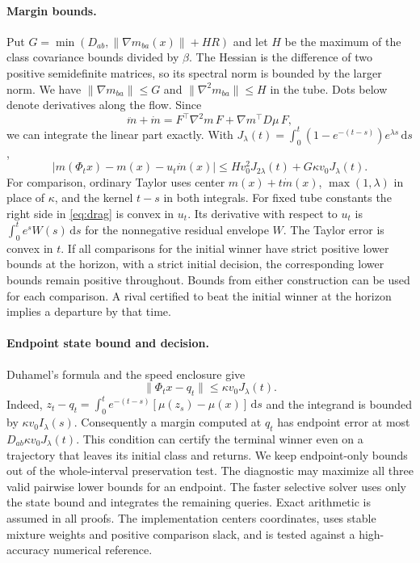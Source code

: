 \documentclass[10pt]{article}
\newcommand{\dd}{\mathrm{d}}
\newcommand{\norm}[1]{\lVert #1\rVert}
\begin{document}
\paragraph{Margin bounds.}
Put $G=\min(D_{ab},\norm{\nabla m_{ba}(x)}+H R)$ and let $H$ be the maximum of the class covariance bounds divided by $\beta$. The Hessian is the difference of two positive semidefinite matrices, so its spectral norm is bounded by the larger norm. We have $\norm{\nabla m_{ba}}\le G$ and $\norm{\nabla^2m_{ba}}\le H$ in the tube. Dots below denote derivatives along the flow. Since
\[
 \ddot m+\dot m=F^\top \nabla^2m\,F+\nabla m^\top D\mu\,F,
\]
we can integrate the linear part exactly. With $J_\lambda(t)=\int_0^t(1-e^{-(t-s)})e^{\lambda s}\,\dd s$,
\begin{equation}
 |m(\Phi_t x)-m(x)-u_t\dot m(x)|
 \le H v_0^2 J_{2\lambda}(t) + G\kappa v_0 J_\lambda(t).
 \label{eq:drag}
\end{equation}
For comparison, ordinary Taylor uses center $m(x)+t\dot m(x)$, $\max(1,\lambda)$ in place of $\kappa$, and the kernel $t-s$ in both integrals. For fixed tube constants the right side in \eqref{eq:drag} is convex in $u_t$. Its derivative with respect to $u_t$ is $\int_0^t e^s W(s)\,\dd s$ for the nonnegative residual envelope $W$. The Taylor error is convex in $t$. If all comparisons for the initial winner have strict positive lower bounds at the horizon, with a strict initial decision, the corresponding lower bounds remain positive throughout. Bounds from either construction can be used for each comparison. A rival certified to beat the initial winner at the horizon implies a departure by that time.

\paragraph{Endpoint state bound and decision.}
Duhamel's formula and the speed enclosure give
\[
 \norm{\Phi_t x-q_t}\le\kappa v_0 J_\lambda(t).
\]
Indeed, $z_t-q_t=\int_0^t e^{-(t-s)}[\mu(z_s)-\mu(x)]\,\dd s$ and the integrand is bounded by $\kappa v_0 I_\lambda(s)$. Consequently a margin computed at $q_t$ has endpoint error at most $D_{ab}\kappa v_0 J_\lambda(t)$. This condition can certify the terminal winner even on a trajectory that leaves its initial class and returns. We keep endpoint-only bounds out of the whole-interval preservation test. The diagnostic may maximize all three valid pairwise lower bounds for an endpoint. The faster selective solver uses only the state bound and integrates the remaining queries. Exact arithmetic is assumed in all proofs. The implementation centers coordinates, uses stable mixture weights and positive comparison slack, and is tested against a high-accuracy numerical reference.
\end{document}
